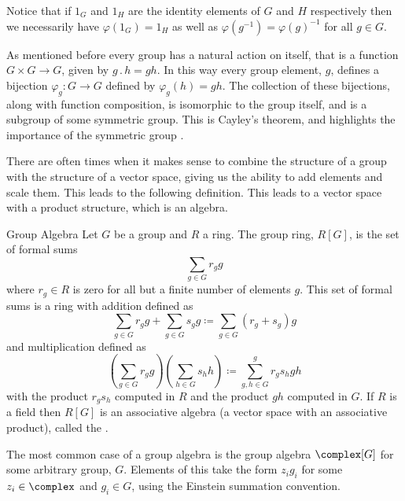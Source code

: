 \documentclass[fleqn]{NotesClass}
\newcommand{\identity}{1}
\newcommand{\action}{\mathbin{.}}
\begin{document}
    Notice that if \(\identity_G\) and \(\identity_H\) are the identity elements of \(G\) and \(H\) respectively then we necessarily have \(\varphi(\identity_G) = \identity_H\) as well as \(\varphi(g^{-1}) = \varphi(g)^{-1}\) for all \(g \in G\).
    
    As mentioned before every group has a natural action on itself, that is a function \(G \times G \to G\), given by \(g \action h = gh\).
    In this way every group element, \(g\), defines a bijection \(\varphi_g \colon G \to G\) defined by \(\varphi_g(h) = gh\).
    The collection of these bijections, along with function composition, is isomorphic to the group itself, and is a subgroup of some symmetric group.
    This is Cayley's theorem, and highlights the importance of the symmetric group \cite[120]{dummit}.
    
    There are often times when it makes sense to combine the structure of a group with the structure of a vector space, giving us the ability to add elements and scale them.
    This leads to the following definition.
    This leads to a vector space with a product structure, which is an algebra.
    
    \begin{dfn}{Group Algebra}{}
        Let \(G\) be a group and \(R\) a ring.
        The group ring, \(R[G]\), is the set of formal sums
        \begin{equation}
            \sum_{g \in G} r_g g
        \end{equation}
        where \(r_g \in R\) is zero for all but a finite number of elements \(g\).
        This set of formal sums is a ring with addition defined as
        \begin{equation}
            \sum_{g \in G} r_g g + \sum_{g \in G} s_g g \coloneqq \sum_{g\in G}(r_g + s_g) g
        \end{equation}
        and multiplication defined as
        \begin{equation}
            \left( \sum_{g \in G} r_g g \right) \left( \sum_{h \in G} s_h h \right) \coloneqq \sum_{g, h \in G}^{g} r_g s_h gh
        \end{equation}
        with the product \(r_gs_h\) computed in \(R\) and the product \(gh\) computed in \(G\).
        If \(R\) is a field then \(R[G]\) is an associative algebra (a vector space with an associative product), called the  \cite[740]{hassani}.
    \end{dfn}
    
    The most common case of a group algebra is the group algebra \(\complex[G]\) for some arbitrary group, \(G\).
    Elements of this take the form \(z_i g_i\) for some \(z_i \in \complex\) and \(g_i \in G\), using the Einstein summation convention.
    
\end{document}
